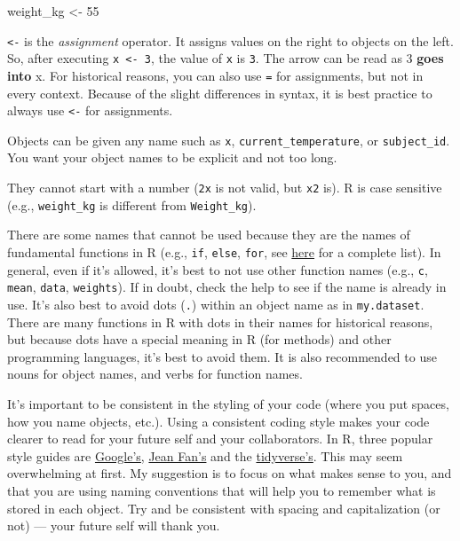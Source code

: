 \documentclass[
]{book}
\newenvironment{Shaded}{\begin{snugshade}}{\end{snugshade}}
\newcommand{\DecValTok}[1]{\textcolor[rgb]{0.00,0.00,0.81}{#1}}
\newcommand{\NormalTok}[1]{#1}
\newcommand{\OtherTok}[1]{\textcolor[rgb]{0.56,0.35,0.01}{#1}}
\begin{document}
\begin{Shaded}
\begin{Highlighting}[]
\NormalTok{weight\_kg }\OtherTok{\textless{}{-}} \DecValTok{55}
\end{Highlighting}
\end{Shaded}

\texttt{\textless{}-} is the \emph{assignment} operator. It assigns values on the right to objects on the left. So, after executing \texttt{x\ \textless{}-\ 3}, the value of \texttt{x} is \texttt{3}. The arrow can be read as 3 \textbf{goes into} x. For historical reasons, you can also use \texttt{=} for assignments, but not in every context. Because of the slight differences in syntax, it is best practice to always use \texttt{\textless{}-} for assignments.

Objects can be given any name such as \texttt{x}, \texttt{current\_temperature}, or \texttt{subject\_id}. You want your object names to be explicit and not too long.

They cannot start with a number (\texttt{2x} is not valid, but \texttt{x2} is). R is case sensitive (e.g., \texttt{weight\_kg} is different from \texttt{Weight\_kg}).

There are some names that cannot be used because they are the names of fundamental functions in R (e.g., \texttt{if}, \texttt{else}, \texttt{for}, see \href{https://stat.ethz.ch/R-manual/R-devel/library/base/html/Reserved.html}{here} for a complete list). In general, even if it's allowed, it's best to not use other function names (e.g., \texttt{c}, \texttt{mean}, \texttt{data}, \texttt{weights}). If in doubt, check the help to see if the name is already in use. It's also best to avoid dots (\texttt{.}) within an object name as in \texttt{my.dataset}. There are many functions in R with dots in their names for historical reasons, but because dots have a special meaning in R (for methods) and other programming languages, it's best to avoid them. It is also recommended to use nouns for object names, and verbs for function names.

It's important to be consistent in the styling of your code (where you put spaces, how you name objects, etc.). Using a consistent coding style makes your code clearer to read for your future self and your collaborators. In R, three popular style guides are \href{https://google.github.io/styleguide/Rguide.xml}{Google's}, \href{\%22http://jef.works/R-style-guide/\%22}{Jean Fan's} and the \href{https://style.tidyverse.org/}{tidyverse's}.
This may seem overwhelming at first. My suggestion is to focus on what makes sense to you, and that you are using naming conventions that will help you to remember what is stored in each object. Try and be consistent with spacing and capitalization (or not) --- your future self will thank you.
\end{document}
